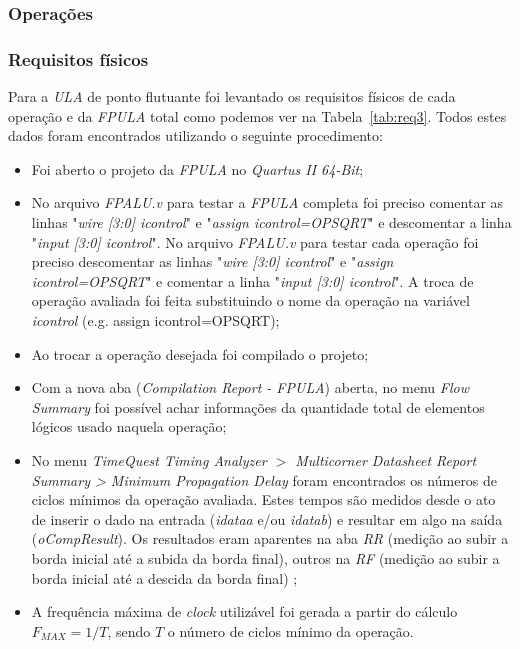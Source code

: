 \documentclass[12pt]{article}
\begin{document}
\subsubsection{Operações}
\label{subsubsec:3op}


\subsubsection{Requisitos físicos}
\label{subsubsec:fpulafis}

Para a \textit{ULA} de ponto flutuante foi levantado os requisitos físicos de cada operação e da \textit{FPULA} total como podemos ver na Tabela~\ref{tab:req3}. Todos estes dados foram encontrados utilizando o seguinte procedimento:

\begin{itemize}
	\item Foi aberto o projeto da \textit{FPULA} no \textit{Quartus II 64-Bit};
	\item No arquivo \textit{FPALU.v} para testar a \textit{FPULA} completa foi preciso comentar as linhas "\textit{wire [3:0] icontrol}" e "\textit{assign icontrol=OPSQRT}" e descomentar a linha "\textit{input [3:0] icontrol}". No arquivo \textit{FPALU.v} para testar cada operação foi preciso descomentar as linhas "\textit{wire [3:0] icontrol}" e "\textit{assign icontrol=OPSQRT}" e comentar a linha "\textit{input [3:0] icontrol}". A troca de operação avaliada foi feita substituindo o nome da operação na variável \textit{icontrol} (e.g. assign icontrol=OPSQRT);
	\item Ao trocar a operação desejada foi compilado o projeto;
	\item Com a nova aba (\textit{Compilation Report - FPULA}) aberta, no menu \textit{Flow Summary} foi possível achar informações da quantidade total de elementos lógicos usado naquela operação;
	\item No menu \textit{TimeQuest Timing Analyzer $>$ Multicorner Datasheet Report Summary > Minimum Propagation Delay} foram encontrados os números de ciclos mínimos da operação avaliada. Estes tempos são medidos desde o ato de inserir o dado na entrada (\textit{idataa} e/ou \textit{idatab}) e resultar em algo na saída (\textit{oCompResult}). Os resultados eram aparentes na aba \textit{RR} (medição ao subir a borda inicial até a subida da borda final), outros na \textit{RF} (medição ao subir a borda inicial até a descida da borda final) \cite{altera};
	\item A frequência máxima de \textit{clock} utilizável foi gerada a partir do cálculo $F_{MAX} = 1/T$, sendo $T$ o número de ciclos mínimo da operação.
\end{itemize}
\end{document}

